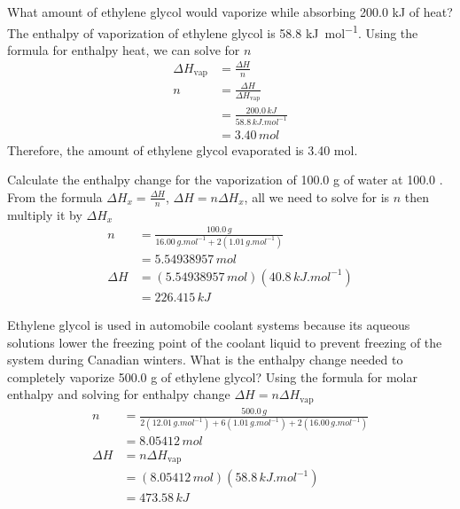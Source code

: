 \begin{sample}{What amount of ethylene glycol would vaporize while absorbing 200.0 kJ of heat?}
    The enthalpy of vaporization of ethylene glycol is 58.8 \si{kJ.mol^{-1}}. Using the formula
    for enthalpy heat, we can solve for $n$
    \begin{align*}
        \Delta H_\text{vap}&=\frac{\Delta H}{n}\\
        n&=\frac{\Delta H}{\Delta H_\text{vap}}\\
         &=\frac{200.0\,\si{kJ}}{58.8\,\si{kJ.mol^{-1}}}\\
         &=3.40\,\si{mol}
    \end{align*}
    Therefore, the amount of ethylene glycol evaporated is 3.40 mol.
\end{sample}

\begin{sample}{Calculate the enthalpy change for the vaporization of 100.0 g of water at 100.0 \celsius.}
    From the formula $\Delta H_x=\frac{\Delta H}{n}$, $\Delta H=n\Delta H_x$, all we need to solve
    for is $n$ then multiply it by $\Delta H_x$
    \begin{align*}
        n&=\frac{100.0\,\si{g}}{16.00\,\si{g.mol^{-1}}+2(1.01\,\si{g.mol^{-1}})}\\
         &=5.54938957\,\si{mol}\\
        \Delta H&=(5.54938957\,\si{mol})(40.8\,\si{kJ.mol^{-1}})\\
                &=226.415\,\si{kJ}
    \end{align*}
\end{sample}

\begin{sample}{Ethylene glycol is used in automobile coolant systems because its aqueous solutions
    lower the freezing point of the coolant liquid to prevent freezing of the system during
    Canadian winters. What is the enthalpy change needed to completely vaporize 500.0 g of ethylene
    glycol?}
    Using the formula for molar enthalpy and solving for enthalpy change $\Delta H=n\Delta H_\text{vap}$
    \begin{align*}
        n&=\frac{500.0\,\si{g}}{2(12.01\,\si{g.mol^{-1}})+6(1.01\,\si{g.mol^{-1}})+2(16.00\,\si{g.mol^{-1}})}\\
         &=8.05412\,\si{mol}\\
        \Delta H&=n\Delta H_\text{vap}\\
                &=(8.05412\,\si{mol})(58.8\,\si{kJ.mol^{-1}})\\
                &=473.58\,\si{kJ}
    \end{align*}
\end{sample}

